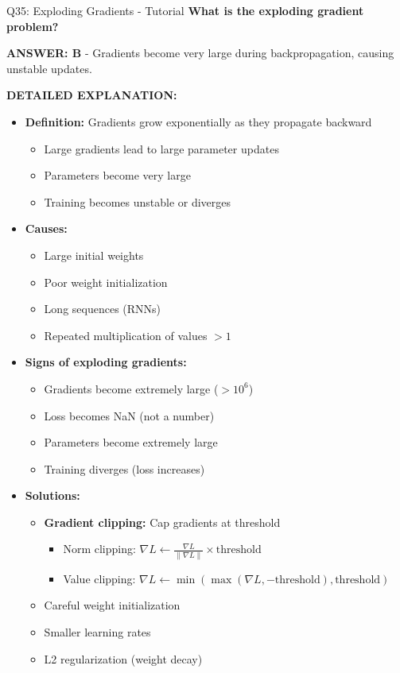 \documentclass[8pt]{beamer}
\begin{document}
	\begin{frame}{Q35: Exploding Gradients - Tutorial}
		\fontsize{6.5}{7.5}\selectfont
		\textbf{What is the exploding gradient problem?}
		
		\vspace{0.05cm}
		\textcolor{myblue}{\textbf{ANSWER: B}} - Gradients become very large during backpropagation, causing unstable updates.
		
		\vspace{0.05cm}
		\textbf{DETAILED EXPLANATION:}
		\begin{itemize}
			\item \textbf{Definition:} Gradients grow exponentially as they propagate backward
			\begin{itemize}
				\item Large gradients lead to large parameter updates
				\item Parameters become very large
				\item Training becomes unstable or diverges
			\end{itemize}
			\item \textbf{Causes:}
			\begin{itemize}
				\item Large initial weights
				\item Poor weight initialization
				\item Long sequences (RNNs)
				\item Repeated multiplication of values $> 1$
			\end{itemize}
			\item \textbf{Signs of exploding gradients:}
			\begin{itemize}
				\item Gradients become extremely large ($> 10^6$)
				\item Loss becomes NaN (not a number)
				\item Parameters become extremely large
				\item Training diverges (loss increases)
			\end{itemize}
			\item \textbf{Solutions:}
			\begin{itemize}
				\item \textbf{Gradient clipping:} Cap gradients at threshold
				\begin{itemize}
					\item Norm clipping: $\nabla L \leftarrow \frac{\nabla L}{\|\nabla L\|} \times \text{threshold}$
					\item Value clipping: $\nabla L \leftarrow \min(\max(\nabla L, -\text{threshold}), \text{threshold})$
				\end{itemize}
				\item Careful weight initialization
				\item Smaller learning rates
				\item L2 regularization (weight decay)
			\end{itemize}
		\end{itemize}
		

\end{frame}
\end{document}
